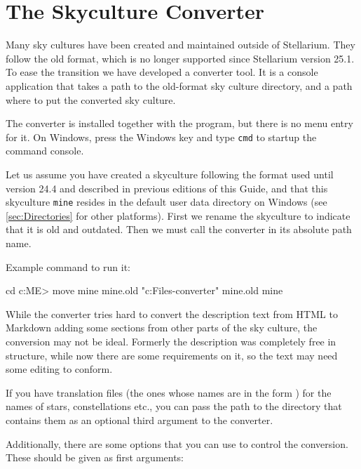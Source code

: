 \section{The Skyculture Converter}
\label{ch:SkyCultures:converter}

Many sky cultures have been created and maintained outside of Stellarium. They follow the old format, which is no longer supported since Stellarium version 25.1. 
To ease the transition we have developed a converter tool. It is a console application that takes a path to the old-format sky culture directory, 
and a path where to put the converted sky culture. 

The converter is installed together with the program, but there is no menu entry for it. 
On Windows, press the Windows key and type \texttt{cmd} to startup the command console. 

Let us assume you have created a skyculture following the format used until version 24.4 and described in previous editions of this Guide, 
and that this skyculture \texttt{mine} resides in the default user data directory on Windows (see \ref{sec:Directories} for other platforms). 
First we rename the skyculture to indicate that it is old and outdated. Then we must call the converter in its absolute path name.

 
Example command to run it:

\begin{commands}[\footnotesize]
cd c:\Users\<ME>\AppData\Roaming\skycultures
move mine mine.old
"c:\Program Files\stellarium\skyculture-converter" mine.old mine
\end{commands}

While the converter tries hard to convert the description text from HTML to Markdown adding some sections from other parts of the sky culture, the conversion may not be ideal. 
Formerly the description was completely free in structure, while now there are some requirements on it, so the text may need some editing to conform.

If you have  translation files (the ones whose names are in the form ) for the names of stars, constellations etc., 
you can pass the path to the directory that contains them as an optional third argument to the converter.

Additionally, there are some options that you can use to control the conversion. These should be given as first arguments:

